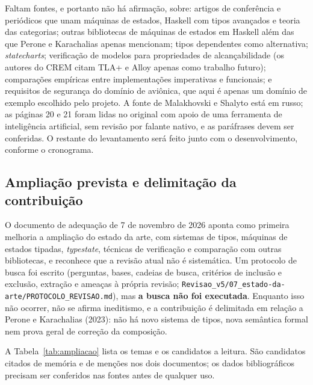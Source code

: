 \documentclass[12pt,a4paper]{article}
\begin{document}
Faltam fontes, e portanto não há afirmação, sobre: artigos de conferência e periódicos que unam máquinas de estados, Haskell com tipos avançados e teoria das categorias; outras bibliotecas de máquinas de estados em Haskell além das que Perone e Karachalias apenas mencionam; tipos dependentes como alternativa; \textit{statecharts}; verificação de modelos para propriedades de alcançabilidade (os autores do CREM citam TLA+ e Alloy apenas como trabalho futuro); comparações empíricas entre implementações imperativas e funcionais; e requisitos de segurança do domínio de aviônica, que aqui é apenas um domínio de exemplo escolhido pelo projeto. A fonte de Malakhovski e Shalyto está em russo; as páginas 20 e 21 foram lidas no original com apoio de uma ferramenta de inteligência artificial, sem revisão por falante nativo, e as paráfrases devem ser conferidas. O restante do levantamento será feito junto com o desenvolvimento, conforme o cronograma.

\subsection{Ampliação prevista e delimitação da contribuição}

O documento de adequação de 7 de novembro de 2026 aponta como primeira melhoria a ampliação do estado da arte, com sistemas de tipos, máquinas de estados tipadas, \textit{typestate}, técnicas de verificação e comparação com outras bibliotecas, e reconhece que a revisão atual não é sistemática. Um protocolo de busca foi escrito (perguntas, bases, cadeias de busca, critérios de inclusão e exclusão, extração e ameaças à própria revisão; \texttt{Revisao\_v5/07\_estado-da-arte/PROTOCOLO\_REVISAO.md}), mas \textbf{a busca não foi executada}. Enquanto isso não ocorrer, não se afirma ineditismo, e a contribuição é delimitada em relação a Perone e Karachalias (2023): não há novo sistema de tipos, nova semântica formal nem prova geral de correção da composição.

A Tabela~\ref{tab:ampliacao} lista os temas e os candidatos a leitura. São candidatos citados de memória e de menções nos dois documentos; os dados bibliográficos precisam ser conferidos nas fontes antes de qualquer uso.
\end{document}
